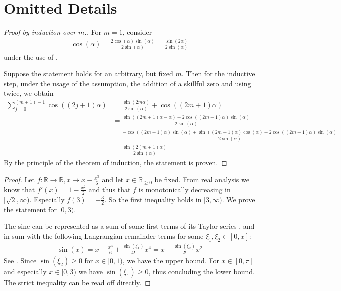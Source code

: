 \appendix

\section{Omitted Details}

\aacosinehelpersumlemma*\label{aa_cosine_helper_sum_lemma_proof}

\begin{proof}[Proof by induction over \(m\).]
    For \(m = 1\), consider
    \begin{align}
        \cos(\alpha) = \frac{2\cos(\alpha)\sin(\alpha)}{2\sin(\alpha)} = \frac{\sin(2\alpha)}{2\sin(\alpha)}
    \end{align}
    under the use of .

    Suppose the statement holds for an arbitrary, but fixed \(m\). Then for the inductive step, under the usage of the assumption, the addition of a skillful zero and using  twice, we obtain
    \begin{align}
        \sum_{j=0}^{(m+1)-1}\cos((2j+1)\alpha) &= \frac{\sin(2m\alpha)}{2\sin(\alpha)} + \cos((2m+1)\alpha)\\
        &= \frac{\sin((2m+1)\alpha-\alpha)+2\cos((2m+1)\alpha)\sin(\alpha)}{2\sin(\alpha)}\\
        &= \frac{-\cos((2m+1)\alpha)\sin(\alpha)+\sin((2m+1)\alpha)\cos(\alpha)+2\cos((2m+1)\alpha)\sin(\alpha)}{2\sin(\alpha)}\\
        &= \frac{\sin(2(m+1)\alpha)}{2\sin(\alpha)}
    \end{align}
    By the principle of the theorem of induction, the statement is proven.
\end{proof}

\sinebound*\label{sine_bound_proof}

\begin{proof}
    Let \(f\colon \mathbb{R} \to \mathbb{R}, x \mapsto x-\frac{x^3}{6}\) and let \(x \in \mathbb{R}_{\geq 0}\) be fixed. From real analysis we know that \(f'(x) = 1 - \frac{x^2}{2}\) and thus that \(f\) is monotonically decreasing in \([\sqrt{2}, \infty)\). Especially \(f(3) = -\frac{3}{2}\). So the first inequality holds in \([3, \infty)\). We prove the statement for \([0, 3)\).

    The sine can be represented as a sum of some first terms of its Taylor series , and in sum with the following Langrangian remainder terms for some \(\xi_1, \xi_2 \in [0, x]\):
    \begin{align}
        \sin(x) = x - \frac{x^3}{6} + \frac{\sin(\xi_1)}{4!}x^4 = x - \frac{\sin(\xi_2)}{2!}x^2
    \end{align}
    See \cite[p. 284]{Forster2016}. Since \(\sin(\xi_2) \geq 0\) for \(x \in [0, 1)\), we have the upper bound. For \(x \in [0, \pi]\) and especially \(x \in [0, 3)\) we have \(\sin(\xi_1) \geq 0\), thus concluding the lower bound. The strict inequality can be read off directly.
\end{proof}

